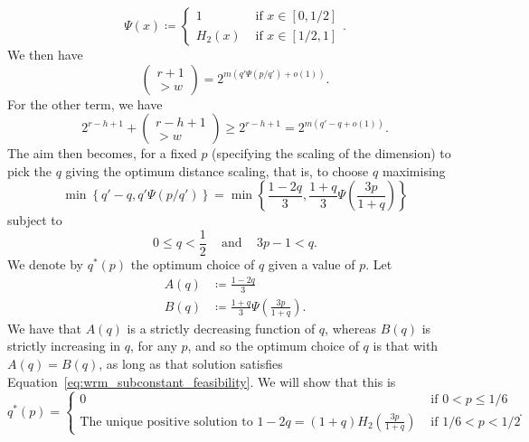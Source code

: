 \documentclass{article}
\begin{document}
\begin{equation}
    \Psi(x) \coloneq \begin{cases}
        1 &\text{ if } x \in [0,1/2]\\
        H_2(x) &\text{ if } x \in [1/2,1]
    \end{cases}.
\end{equation}
We then have
\begin{equation}
    \begin{pmatrix}
        r+1\\>w
    \end{pmatrix} = 2^{m\left(q'\Psi(p/q')+o(1)\right)}.
\end{equation}
For the other term, we have
\begin{equation}
    2^{r-h+1} + \left(\begin{smallmatrix}r-h+1\\>w\end{smallmatrix}\right) \geq 2^{r-h+1} = 2^{m\left(q'-q + o(1)\right)}.
\end{equation}
The aim then becomes, for a fixed $p$ (specifying the scaling of the dimension) to pick the $q$ giving the optimum distance scaling, that is, to choose $q$ maximising
\begin{equation}
    \min\left\{q'-q, q'\Psi(p/q')\right\} = \min\left\{\frac{1-2q}{3},\frac{1+q}{3}\Psi\left(\frac{3p}{1+q}\right)\right\}
\end{equation}
subject to
\begin{equation}\label{eq:wrm_subconstant_feasibility}
    0 \leq q < \frac{1}{2}\;\;\;\text{ and }\;\;\; 3p-1 < q.
\end{equation}
We denote by $q^*(p)$ the optimum choice of $q$ given a value of $p$.
Let
\begin{align}
    A(q) &\coloneq \frac{1-2q}{3}\\
    B(q) &\coloneq \frac{1+q}{3}\Psi\left(\frac{3p}{1+q}\right).
\end{align}
We have that $A(q)$ is a strictly decreasing function of $q$, whereas $B(q)$ is strictly increasing in $q$, for any $p$, and so the optimum choice of $q$ is that with $A(q) = B(q)$, as long as that solution satisfies Equation~\eqref{eq:wrm_subconstant_feasibility}. We will show that this is
\begin{equation}
    q^*(p) = \begin{cases}
        0 &\text{ if } 0 < p \leq 1/6\\
        \text{The unique positive solution to } 1-2q = (1+q)H_2\left(\frac{3p}{1+q}\right) &\text{ if } 1/6< p < 1/2
    \end{cases}.
\end{equation}
\end{document}
